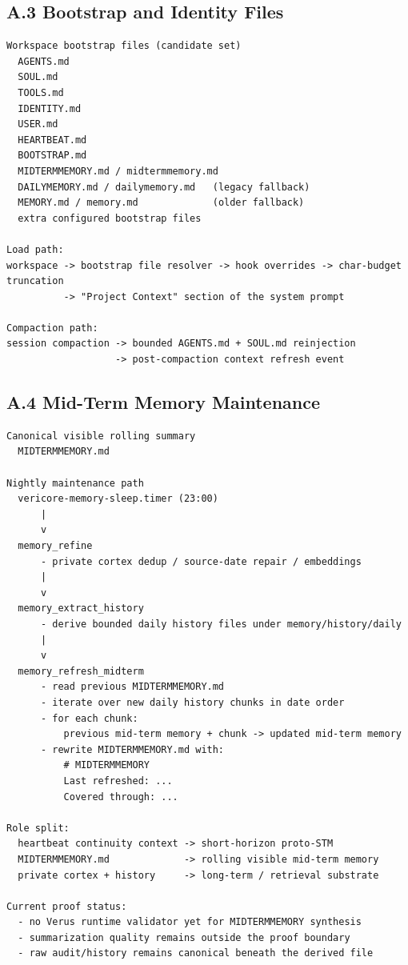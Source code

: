 \documentclass[11pt]{article}
\begin{document}
\subsection{A.3 Bootstrap and Identity Files}
\begin{lstlisting}[style=code]
Workspace bootstrap files (candidate set)
  AGENTS.md
  SOUL.md
  TOOLS.md
  IDENTITY.md
  USER.md
  HEARTBEAT.md
  BOOTSTRAP.md
  MIDTERMMEMORY.md / midtermmemory.md
  DAILYMEMORY.md / dailymemory.md   (legacy fallback)
  MEMORY.md / memory.md             (older fallback)
  extra configured bootstrap files

Load path:
workspace -> bootstrap file resolver -> hook overrides -> char-budget truncation
          -> "Project Context" section of the system prompt

Compaction path:
session compaction -> bounded AGENTS.md + SOUL.md reinjection
                   -> post-compaction context refresh event
\end{lstlisting}

\subsection{A.4 Mid-Term Memory Maintenance}
\begin{lstlisting}[style=code]
Canonical visible rolling summary
  MIDTERMMEMORY.md

Nightly maintenance path
  vericore-memory-sleep.timer (23:00)
      |
      v
  memory_refine
      - private cortex dedup / source-date repair / embeddings
      |
      v
  memory_extract_history
      - derive bounded daily history files under memory/history/daily
      |
      v
  memory_refresh_midterm
      - read previous MIDTERMMEMORY.md
      - iterate over new daily history chunks in date order
      - for each chunk:
          previous mid-term memory + chunk -> updated mid-term memory
      - rewrite MIDTERMMEMORY.md with:
          # MIDTERMMEMORY
          Last refreshed: ...
          Covered through: ...

Role split:
  heartbeat continuity context -> short-horizon proto-STM
  MIDTERMMEMORY.md             -> rolling visible mid-term memory
  private cortex + history     -> long-term / retrieval substrate

Current proof status:
  - no Verus runtime validator yet for MIDTERMMEMORY synthesis
  - summarization quality remains outside the proof boundary
  - raw audit/history remains canonical beneath the derived file
\end{lstlisting}
\end{document}
